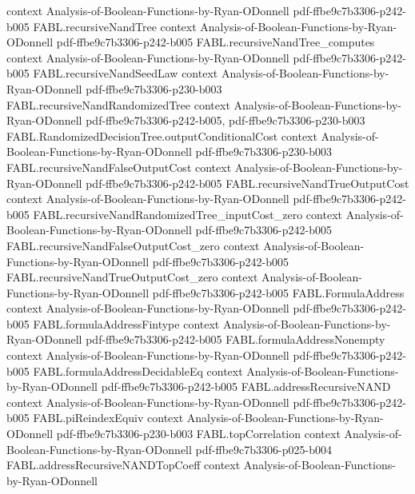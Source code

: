 \begin{theorem}
  {context}
  {Analysis-of-Boolean-Functions-by-Ryan-ODonnell}
  {pdf-ffbe9c7b3306-p242-b005}
\proofstep
  {FABL.recursiveNandTree}
  {context}
  {Analysis-of-Boolean-Functions-by-Ryan-ODonnell}
  {pdf-ffbe9c7b3306-p242-b005}
\proofstep
  {FABL.recursiveNandTree_computes}
  {context}
  {Analysis-of-Boolean-Functions-by-Ryan-ODonnell}
  {pdf-ffbe9c7b3306-p242-b005}
\proofstep
  {FABL.recursiveNandSeedLaw}
  {context}
  {Analysis-of-Boolean-Functions-by-Ryan-ODonnell}
  {pdf-ffbe9c7b3306-p230-b003}
\proofstep
  {FABL.recursiveNandRandomizedTree}
  {context}
  {Analysis-of-Boolean-Functions-by-Ryan-ODonnell}
  {pdf-ffbe9c7b3306-p242-b005,
    pdf-ffbe9c7b3306-p230-b003}
\proofstep
  {FABL.RandomizedDecisionTree.outputConditionalCost}
  {context}
  {Analysis-of-Boolean-Functions-by-Ryan-ODonnell}
  {pdf-ffbe9c7b3306-p230-b003}
\proofstep
  {FABL.recursiveNandFalseOutputCost}
  {context}
  {Analysis-of-Boolean-Functions-by-Ryan-ODonnell}
  {pdf-ffbe9c7b3306-p242-b005}
\proofstep
  {FABL.recursiveNandTrueOutputCost}
  {context}
  {Analysis-of-Boolean-Functions-by-Ryan-ODonnell}
  {pdf-ffbe9c7b3306-p242-b005}
\proofstep
  {FABL.recursiveNandRandomizedTree_inputCost_zero}
  {context}
  {Analysis-of-Boolean-Functions-by-Ryan-ODonnell}
  {pdf-ffbe9c7b3306-p242-b005}
\proofstep
  {FABL.recursiveNandFalseOutputCost_zero}
  {context}
  {Analysis-of-Boolean-Functions-by-Ryan-ODonnell}
  {pdf-ffbe9c7b3306-p242-b005}
\proofstep
  {FABL.recursiveNandTrueOutputCost_zero}
  {context}
  {Analysis-of-Boolean-Functions-by-Ryan-ODonnell}
  {pdf-ffbe9c7b3306-p242-b005}
\proofstep
  {FABL.FormulaAddress}
  {context}
  {Analysis-of-Boolean-Functions-by-Ryan-ODonnell}
  {pdf-ffbe9c7b3306-p242-b005}
\proofstep
  {FABL.formulaAddressFintype}
  {context}
  {Analysis-of-Boolean-Functions-by-Ryan-ODonnell}
  {pdf-ffbe9c7b3306-p242-b005}
\proofstep
  {FABL.formulaAddressNonempty}
  {context}
  {Analysis-of-Boolean-Functions-by-Ryan-ODonnell}
  {pdf-ffbe9c7b3306-p242-b005}
\proofstep
  {FABL.formulaAddressDecidableEq}
  {context}
  {Analysis-of-Boolean-Functions-by-Ryan-ODonnell}
  {pdf-ffbe9c7b3306-p242-b005}
\proofstep
  {FABL.addressRecursiveNAND}
  {context}
  {Analysis-of-Boolean-Functions-by-Ryan-ODonnell}
  {pdf-ffbe9c7b3306-p242-b005}
\proofstep
  {FABL.piReindexEquiv}
  {context}
  {Analysis-of-Boolean-Functions-by-Ryan-ODonnell}
  {pdf-ffbe9c7b3306-p230-b003}
\proofstep
  {FABL.topCorrelation}
  {context}
  {Analysis-of-Boolean-Functions-by-Ryan-ODonnell}
  {pdf-ffbe9c7b3306-p025-b004}
\proofstep
  {FABL.addressRecursiveNANDTopCoeff}
  {context}
  {Analysis-of-Boolean-Functions-by-Ryan-ODonnell}

\end{theorem}

